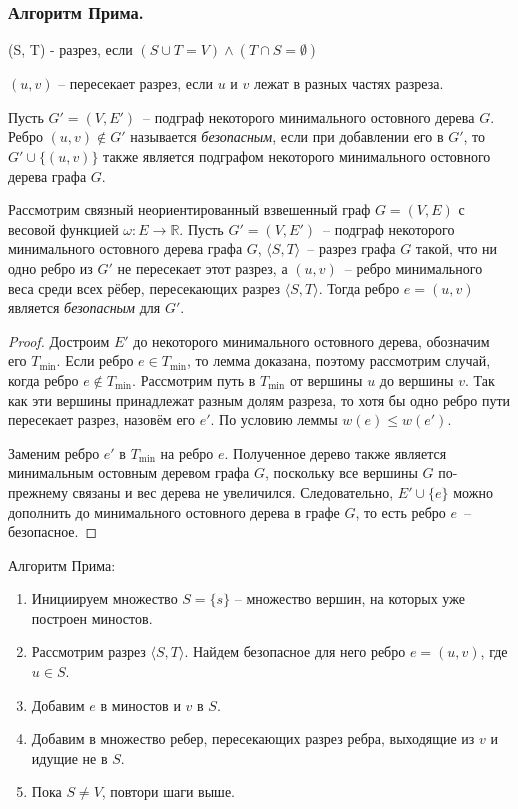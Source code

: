 \documentclass[a4paper,14pt]{article}
\begin{document}
    \subsubsection*{Алгоритм Прима.}
    \begin{Def}
        (S, T) - разрез, если $(S\cup T=V)\wedge (T\cap S=\emptyset)$
    \end{Def}
    \begin{Def}
        $(u,v)$ – пересекает разрез, если $u$ и $v$ лежат в разных частях разреза.
    \end{Def}
    \begin{Def}
        Пусть $G' = (V, E')$~-- подграф некоторого минимального остовного дерева $G$. Ребро $(u, v) \notin G'$ называется \textit{безопасным}, если при добавлении его в $G'$, то $G' \cup \{(u, v)\}$ также является подграфом некоторого минимального остовного дерева графа $G$.
    \end{Def}
    \begin{lemma}
        Рассмотрим связный неориентированный взвешенный граф $G = (V, E)$ с весовой функцией $\omega : E \to \mathbb{R}$. Пусть $G' = (V, E')$~-- подграф некоторого минимального остовного дерева графа $G$, $\langle S, T \rangle$~-- разрез графа $G$ такой, что ни одно ребро из $G'$ не пересекает этот разрез, а $(u, v)$~-- ребро минимального веса среди всех рёбер, пересекающих разрез $\langle S, T \rangle$. Тогда ребро $e = (u, v)$ является \textit{безопасным} для $G'$.
    \end{lemma}
    \begin{proof}
        Достроим $E'$ до некоторого минимального остовного дерева, обозначим его $T_{\text{min}}$. Если ребро $e \in T_{\text{min}}$, то лемма доказана, поэтому рассмотрим случай, когда ребро $e \notin T_{\text{min}}$. Рассмотрим путь в $T_{\text{min}}$ от вершины $u$ до вершины $v$. Так как эти вершины принадлежат разным долям разреза, то хотя бы одно ребро пути пересекает разрез, назовём его $e'$. По условию леммы $w(e) \leq w(e')$.

        Заменим ребро $e'$ в $T_{\text{min}}$ на ребро $e$. Полученное дерево также является минимальным остовным деревом графа $G$, поскольку все вершины $G$ по-прежнему связаны и вес дерева не увеличился. Следовательно, $E' \cup \{e\}$ можно дополнить до минимального остовного дерева в графе $G$, то есть ребро $e$~-- безопасное.
    \end{proof}
    Алгоритм Прима:
    \begin{enumerate}
        \item Инициируем множество $S = \{s\}$ – множество вершин, на
        которых уже построен миностов.
        \item Рассмотрим разрез $\langle S, T \rangle$. Найдем безопасное для него ребро
        $e = (u,v)$, где $u \in S$.
        \item Добавим $e$ в миностов и $v$ в $S$.
        \item Добавим в множество ребер, пересекающих разрез ребра,
        выходящие из $v$ и идущие не в $S$.
        \item Пока $S \neq V$, повтори шаги выше.
    \end{enumerate}
\end{document}
